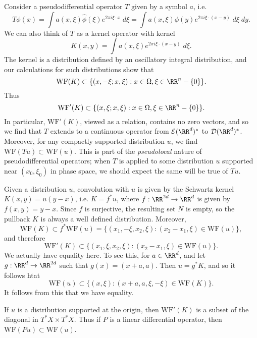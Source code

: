 \begin{example}
    Consider a pseudodifferential operator $T$ given by a symbol $a$, i.e.
    \[ T\phi(x) = \int a(x,\xi) \widehat{\phi}(\xi) e^{2 \pi i \xi \cdot x}\; d\xi = \int a(x,\xi) \phi(y) e^{2 \pi i \xi \cdot (x - y)}\; d\xi\; dy. \]
    We can also think of $T$ as a kernel operator with kernel
    \[ K(x,y) = \int a(x,\xi) e^{2 \pi i \xi \cdot (x - y)} \; d\xi. \]
    The kernel is a distribution defined by an oscillatory integral distribution, and our calculations for such distributions show that
    \[ \text{WF}(K) \subset \{ (x,-\xi;x,\xi) : x \in \Omega, \xi \in \RR^n - \{ 0 \} \}. \]
    Thus
    \[ \text{WF}'(K) \subset \{ (x,\xi;x,\xi) : x \in \Omega, \xi \in \RR^n - \{ 0 \} \}. \]
    In particular, $\text{WF}'(K)$, viewed as a relation, contains no zero vectors, and so we find that $T$ extends to a continuous operator from $\mathcal{E}(\RR^d)^*$ to $\mathcal{D}(\RR^d)^*$. Moreover, for any compactly supported distribution $u$, we find $\text{WF}(Tu) \subset \text{WF}(u)$. This is part of the \emph{pseudolocal} nature of pseudodifferential operators; when $T$ is applied to some distribution $u$ supported near $(x_0,\xi_0)$ in phase space, we should expect the same will be true of $Tu$.
\end{example}

\begin{example}
    Given a distribution $u$, convolution with $u$ is given by the Schwartz kernel $K(x,y) = u(y-x)$, i.e. $K = f^* u$, where $f:\RR^{2d} \to \RR^d$ is given by $f(x,y) = y-x$. Since $f$ is surjective, the resulting set $N$ is empty, so the pullback $K$ is always a well defined distribution. Moreover,
    \[ \text{WF}(K) \subset f^* \text{WF}(u) = \{ (x_1,-\xi,x_2,\xi): (x_2 - x_1, \xi) \in \text{WF}(u) \}, \]     
    and therefore
    \[ \text{WF}'(K) \subset \{ (x_1,\xi,x_2,\xi): (x_2 - x_1,\xi) \in \text{WF}(u) \}. \]
    We actually have equality here. To see this, for $a \in \RR^d$, and let $g: \RR^d \to \RR^{2d}$ such that $g(x) = (x + a, a)$. Then $u = g^* K$, and so it follows htat
    \[ \text{WF}(u) \subset \{ (x,\xi) : (x + a, a, \xi, -\xi) \in \text{WF}(K) \}. \]
    It follows from this that we have equality.

    If $u$ is a distribution supported at the origin, then $\text{WF}'(K)$ is a subset of the diagonal in $T^* X \times T^* X$. Thus if $P$ is a linear differential operator, then $\text{WF}(Pu) \subset \text{WF}(u)$.
\end{example}

